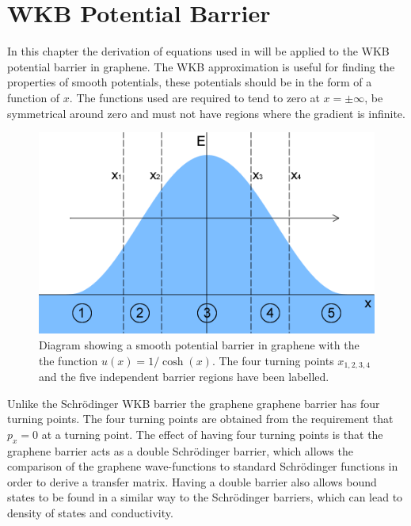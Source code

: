 %
%
%
\chapter{WKB Potential Barrier}
\label{WKB Potential Barrier}
		In this chapter the derivation of equations used in \cite{b30,b72} will be applied to the WKB potential barrier in graphene. The WKB approximation is useful for finding the properties of smooth potentials, these potentials should be in the form of a function of $x$. The functions used are required to tend to zero at $x=\pm\infty$, be symmetrical around zero and must not have regions where the gradient is infinite.
		\begin{figure}[h]
			\centerline{\includegraphics[scale=0.6]{images/wkb-barrier}}
			\caption{Diagram showing a smooth potential barrier in graphene with the the function $u\left(x\right)=1/\cosh(x)$. The four turning points $x_{1,2,3,4}$ and the five independent barrier regions have been labelled.}
			\label{fig:wkb-barrier}
		\end{figure}

		Unlike the Schr{\" o}dinger WKB barrier the graphene graphene barrier has four turning points. The four turning points are obtained from the requirement that $p_{x}=0$ at a turning point. The effect of having four turning points is that the graphene barrier acts as a double Schr{\" o}dinger barrier, which allows the comparison of the graphene wave-functions to standard Schr{\" o}dinger functions in order to derive a transfer matrix. Having a double barrier also allows bound states to be found in a similar way to the Schr{\" o}dinger barriers, which can lead to density of states and conductivity.

